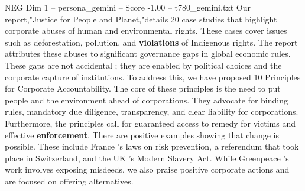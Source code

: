 \begin{textsample}{NEG Dim 1 – persona\_gemini – Score -1.00 – t780\_gemini.txt}  \label{ex:f1_neg_019}
Our report,"Justice for People and Planet,"details 20 case studies that highlight corporate abuses of human and environmental rights.
These cases cover issues such as deforestation, pollution, and \textbf{violations} of Indigenous rights.
The report attributes these abuses to significant governance gaps in global economic rules.
These gaps are not accidental ; they are enabled by political choices and the corporate capture of institutions.
To address this, we have proposed 10 Principles for Corporate Accountability.
The core of these principles is the need to put people and the environment ahead of corporations.
They advocate for binding rules, mandatory due diligence, transparency, and clear liability for corporations.
Furthermore, the principles call for guaranteed access to remedy for victims and effective \textbf{enforcement}.
There are positive examples showing that change is possible.
These include France 's laws on risk prevention, a referendum that took place in Switzerland, and the UK 's Modern Slavery Act.
While Greenpeace 's work involves exposing misdeeds, we also praise positive corporate actions and are focused on offering alternatives.

\end{textsample}
